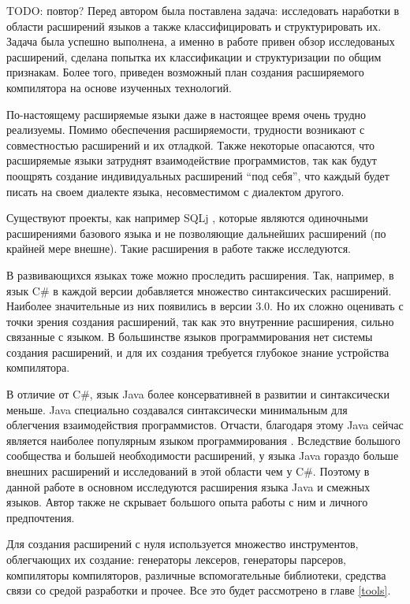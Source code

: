 \documentclass[a4paper,12pt]{article}
\begin{document}
TODO: повтор?
Перед автором была поставлена задача: исследовать наработки в области 
расширений языков а также классифицировать и структурировать их.
Задача была успешно выполнена, а именно в работе привен обзор исследованых
расширений, сделана попытка их классификации и структуризации по общим
признакам. Более того, приведен возможный план создания расширяемого
компилятора на основе изученных технологий.

По-настоящему расширяемые языки даже в настоящее время очень трудно
реализуемы. Помимо обеспечения расширяемости, трудности возникают с
совместностью расширений и их отладкой. Также некоторые опасаются, что
расширяемые языки затруднят взаимодействие программистов, так как будут
поощрять создание индивидуальных расширений ``под себя'', что каждый будет
писать на своем диалекте языка, несовместимом с диалектом другого.

Существуют проекты, как например SQLj \cite{sqlj}, которые являются одиночными
расширениями базового языка и не позволяющие дальнейших расширений (по
крайней мере внешне). Такие расширения в работе также исследуются.

В развивающихся языках тоже можно проследить расширения. Так, например, в язык
C\# в каждой версии добавляется множество синтаксических расширений. Наиболее
значительные из них появились в версии 3.0. Но их сложно оценивать с точки
зрения создания расширений, так как это внутренние расширения, сильно связанные
с языком. В большинстве языков программирования нет системы создания
расширений, и для их создания требуется глубокое знание устройства компилятора.

В отличие от C\#, язык Java более консервативней в развитии и синтаксически
меньше. Java специально создавался синтаксически минимальным для облегчения
взаимодействия программистов. Отчасти, благодаря этому Java сейчас
является наиболее популярным языком программирования \cite{tiobe}. Вследствие 
большого сообщества и большей необходимости расширений, у языка Java
гораздо больше внешних расширений и исследований в этой области чем у C\#.
Поэтому в данной работе в основном исследуются расширения языка Java и смежных
языков. Автор также не скрывает большого опыта работы с ним и личного
предпочтения.

Для создания расширений с нуля используется множество инструментов, облегчающих
их создание: генераторы лексеров, генераторы парсеров, компиляторы
компиляторов, различные вспомогательные библиотеки, средства связи со средой
разработки и прочее. Все это будет рассмотрено в главе \ref{tools}.
\end{document}
